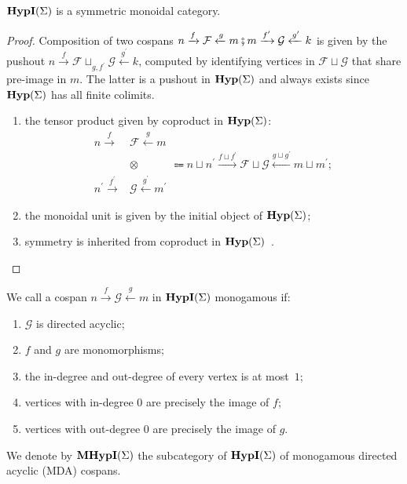 \begin{proposition}
	$\textbf{HypI}(\Sigma)$ is a symmetric monoidal category.
\end{proposition}
\begin{proof}
Composition of two cospans $n \xrightarrow{f} \mathcal{F} \xleftarrow{g} m \fatsemi m \xrightarrow{f^\prime} \mathcal{G} \xleftarrow{g^\prime} k$ is given by the pushout
$
	n \xrightarrow{f} \mathcal{F} \sqcup_{g,f^\prime} \mathcal{G} \xleftarrow{g^\prime} k
$,
computed by identifying vertices in $\mathcal{F} \sqcup \mathcal{G}$ that share pre-image in $m$.
The latter is a pushout in $\mathbf{Hyp}(\Sigma)$ and always exists since $\mathbf{Hyp}(\Sigma)$ has all finite colimits.
	\begin{enumerate}
	\item the tensor product given by coproduct in $\mathbf{Hyp}(\Sigma)$:
	      \begin{align*}
		      n \xrightarrow{f}               & \mathcal{F} \xleftarrow{g} m                                                                                                                                       \\
		                                      & \otimes \qquad \quad \Coloneqq n \sqcup n^\prime \xrightarrow{f \sqcup f^\prime} \mathcal{F} \sqcup \mathcal{G} \xleftarrow{g \sqcup g^\prime} m \sqcup m^\prime ; \\
		      n^\prime \xrightarrow{f^\prime} & \mathcal{G} \xleftarrow{g^\prime} m^\prime
	      \end{align*}
	\item the monoidal unit is given by the initial object of $\mathbf{Hyp}(\Sigma)$;
	\item symmetry is inherited from coproduct in $\mathbf{Hyp}(\Sigma)$~\cite{MonoidalCoproduct}.
\end{enumerate}
\end{proof}

\begin{definition}%
	\label{def:monogamy_hyp}
	We call a cospan $n \xrightarrow{f} \mathcal{G} \xleftarrow{g} m$ in $\textbf{HypI}(\Sigma)$ monogamous if:
	\begin{enumerate}
		\item $\mathcal{G}$ is directed acyclic;
		\item $f$ and $g$ are monomorphisms;
		\item the in-degree and out-degree of every vertex is at most~$1$;
		\item vertices with in-degree $0$ are precisely the image of $f$;
		\item vertices with out-degree $0$ are precisely the image of $g$.
	\end{enumerate}
	We denote by $\textbf{MHypI}(\Sigma)$ the subcategory of $\textbf{HypI}(\Sigma)$ of monogamous directed acyclic (MDA) cospans.
\end{definition}

